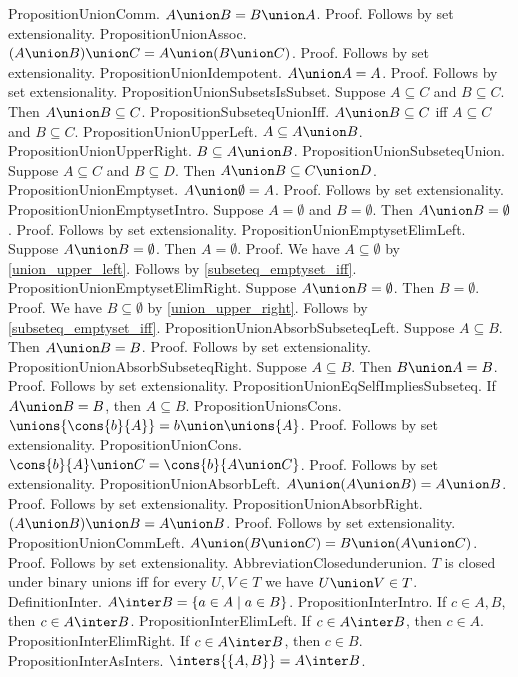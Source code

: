 PropositionUnionComm. $A \union B = B \union A$.
Proof. Follows by set extensionality.
PropositionUnionAssoc. $(A \union B) \union C = A \union (B \union C)$.
Proof. Follows by set extensionality.
PropositionUnionIdempotent. $A \union A = A$.
Proof. Follows by set extensionality.
PropositionUnionSubsetsIsSubset. Suppose $A \subseteq C$ and $B \subseteq C$. Then $A \union B \subseteq C$.
PropositionSubseteqUnionIff. $A \union B \subseteq C$ iff $A \subseteq C$ and $B \subseteq C$.
PropositionUnionUpperLeft. $A \subseteq A \union B$.
PropositionUnionUpperRight. $B \subseteq A \union B$.
PropositionUnionSubseteqUnion. Suppose $A \subseteq C$ and $B \subseteq D$. Then $A \union B \subseteq C \union D$.
PropositionUnionEmptyset. $A \union \emptyset = A$.
Proof. Follows by set extensionality.
PropositionUnionEmptysetIntro. Suppose $A = \emptyset$ and $B = \emptyset$. Then $A \union B = \emptyset$.
Proof. Follows by set extensionality.
PropositionUnionEmptysetElimLeft. Suppose $A \union B = \emptyset$. Then $A = \emptyset$.
Proof. We have $A \subseteq \emptyset$ by \cref{union_upper_left}. Follows by \cref{subseteq_emptyset_iff}.
PropositionUnionEmptysetElimRight. Suppose $A \union B = \emptyset$. Then $B = \emptyset$.
Proof. We have $B \subseteq \emptyset$ by \cref{union_upper_right}. Follows by \cref{subseteq_emptyset_iff}.
PropositionUnionAbsorbSubseteqLeft. Suppose $A \subseteq B$. Then $A \union B = B$.
Proof. Follows by set extensionality.
PropositionUnionAbsorbSubseteqRight. Suppose $A \subseteq B$. Then $B \union A = B$.
Proof. Follows by set extensionality.
PropositionUnionEqSelfImpliesSubseteq. If $A \union B = B$, then $A \subseteq B$.
PropositionUnionsCons. $ \unions{ \cons{b}{A}} = b \union \unions{A}$.
Proof. Follows by set extensionality.
PropositionUnionCons. $ \cons{b}{A} \union C = \cons{b}{A \union C}$.
Proof. Follows by set extensionality.
PropositionUnionAbsorbLeft. $A \union (A \union B) = A \union B$.
Proof. Follows by set extensionality.
PropositionUnionAbsorbRight. $(A \union B) \union B = A \union B$.
Proof. Follows by set extensionality.
PropositionUnionCommLeft. $A \union (B \union C) = B \union (A \union C)$.
Proof. Follows by set extensionality.
AbbreviationClosedunderunion. $T$ is closed under binary unions iff for every $U,V \in T$ we have $U \union V \in T$.
DefinitionInter. $A \inter B = \{ a \in A \mid a \in B \}$.
PropositionInterIntro. If $c \in A, B$, then $c \in A \inter B$.
PropositionInterElimLeft. If $c \in A \inter B$, then $c \in A$.
PropositionInterElimRight. If $c \in A \inter B$, then $c \in B$.
PropositionInterAsInters. $ \inters{ \{A,B \}} = A \inter B$.
